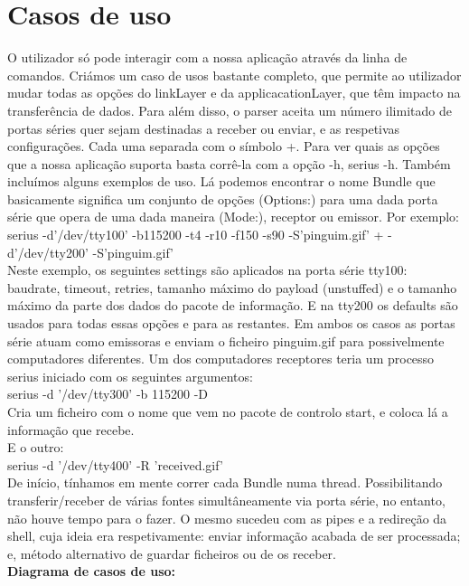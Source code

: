 \documentclass[a4paper]{article}
\begin{document}
\section{Casos de uso}
O utilizador só pode interagir com a nossa aplicação através da linha de comandos. Criámos um caso de usos bastante completo, que permite ao utilizador mudar todas as opções do linkLayer e da applicacationLayer, que têm impacto na transferência de dados. Para além disso, o parser aceita um número ilimitado de portas séries quer sejam destinadas a receber ou enviar, e as respetivas configurações. Cada uma separada com o símbolo +. Para ver quais as opções que a nossa aplicação suporta basta corrê-la com a opção -h, serius -h. Também incluímos alguns exemplos de uso. Lá podemos encontrar o nome Bundle que basicamente significa um conjunto de opções (Options:) para uma dada porta série que opera de uma dada maneira (Mode:), receptor ou emissor. Por exemplo:\\\newline serius -d'/dev/tty100' -b115200 -t4 -r10 -f150 -s90 -S'pinguim.gif' + -d'/dev/tty200' -S'pinguim.gif'\\\newline
Neste exemplo, os seguintes settings são aplicados na porta série tty100: baudrate, timeout, retries, tamanho máximo do payload (unstuffed) e o tamanho máximo da parte dos dados do pacote de informação. E na tty200 os defaults são usados para todas essas opções e para as restantes. Em ambos os casos as portas série atuam como emissoras e enviam o ficheiro pinguim.gif para possivelmente computadores diferentes. Um dos computadores receptores teria um processo serius iniciado com os seguintes argumentos:\\\newline serius -d '/dev/tty300' -b 115200 -D\\ Cria um ficheiro com o nome que vem no pacote de controlo start, e coloca lá a informação que recebe. \\\newline E o outro:\\\newline serius -d '/dev/tty400' -R 'received.gif' \\\newline
De início, tínhamos em mente correr cada Bundle numa thread. Possibilitando transferir/receber de várias fontes simultâneamente via porta série, no entanto, não houve tempo para o fazer. O mesmo sucedeu com as pipes e a redireção da shell, cuja ideia era respetivamente: enviar informação acabada de ser processada; e, método alternativo de guardar ficheiros ou de os receber. \\\newline
\textbf{Diagrama de casos de uso:} \\\newline
\end{document}
